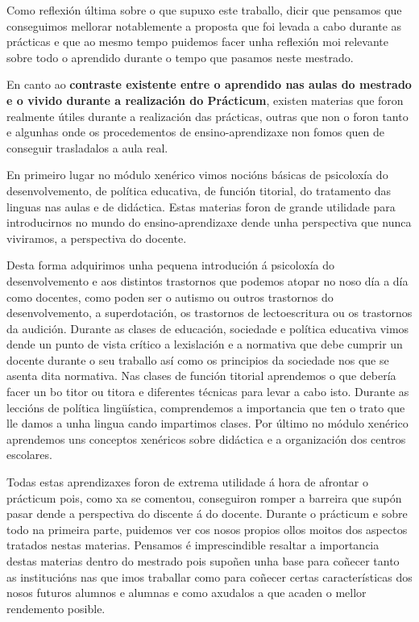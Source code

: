 Como reflexión última sobre o que supuxo este traballo, dicir que pensamos que conseguimos mellorar notablemente a proposta que foi levada a cabo durante as prácticas e que ao mesmo tempo puidemos facer unha reflexión moi relevante sobre todo o aprendido durante o tempo que pasamos neste mestrado.

En canto ao \textbf{contraste existente entre o aprendido nas aulas do mestrado e o vivido durante a realización do Prácticum}, existen materias que foron realmente útiles durante a realización das prácticas, outras que non o foron tanto e algunhas onde os procedementos de ensino-aprendizaxe non fomos quen de conseguir trasladalos a aula real.

En primeiro lugar no módulo xenérico vimos nocións básicas de psicoloxía do desenvolvemento, de política educativa, de función titorial, do tratamento das linguas nas aulas e de didáctica. Estas materias foron de grande utilidade para introducirnos no mundo do ensino-aprendizaxe dende unha perspectiva que nunca viviramos, a perspectiva do docente.

Desta forma adquirimos unha pequena introdución á psicoloxía do desenvolvemento e aos distintos trastornos que podemos atopar no noso día a día como docentes, como poden ser o autismo ou outros trastornos do desenvolvemento, a superdotación, os trastornos de lectoescritura ou os trastornos da audición. Durante as clases de educación, sociedade e política educativa vimos dende un punto de vista crítico a lexislación e a normativa que debe cumprir un docente durante o seu traballo así como os principios da sociedade nos que se asenta dita normativa. Nas clases de función titorial aprendemos o que debería facer un bo titor ou titora e diferentes técnicas para levar a cabo isto. Durante as leccións de política lingüística, comprendemos a importancia que ten o trato que lle damos a unha lingua cando impartimos clases. Por último no módulo xenérico aprendemos uns conceptos xenéricos sobre didáctica e a organización dos centros escolares.

Todas estas aprendizaxes foron de extrema utilidade á hora de afrontar o prácticum pois, como xa se comentou, conseguiron romper a barreira que supón pasar dende a perspectiva do discente á do docente. Durante o prácticum e sobre todo na primeira parte, puidemos ver cos nosos propios ollos moitos dos aspectos tratados nestas materias. Pensamos é imprescindible resaltar a importancia destas materias dentro do mestrado pois supoñen unha base para coñecer tanto as institucións nas que imos traballar como para coñecer certas características dos nosos futuros alumnos e alumnas e como axudalos a que acaden o mellor rendemento posible.


